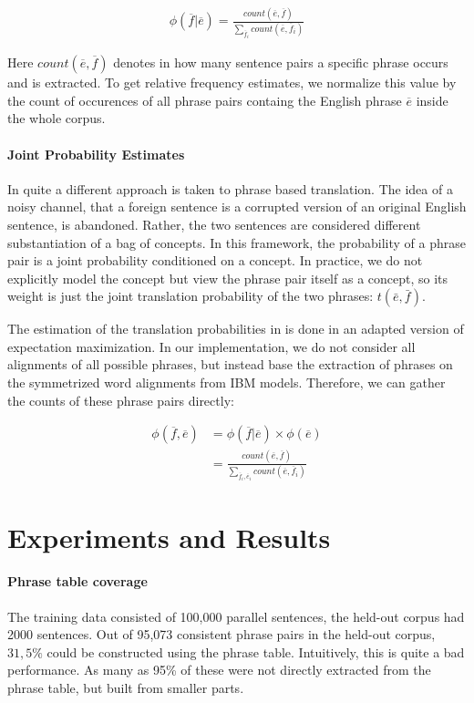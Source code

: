 \documentclass[11pt]{article}
\begin{document}
\begin{align*}
\phi(\overline{f}|\overline{e}) = \frac{count(\overline{e}, \overline{f})}{\sum_{\overline{f}_i} count(\overline{e},\overline{f}_i)}
\end{align*}

Here $count(\overline{e}, \overline{f})$ denotes in how many sentence pairs a specific phrase occurs and is extracted. To get relative frequency estimates, we normalize this value by the count of occurences of all phrase pairs containg the English phrase $\overline{e}$ inside the whole corpus.


\paragraph{Joint Probability Estimates}
In \cite{marcu2002} quite a different approach is taken to phrase based translation. The idea of a noisy channel, that a foreign sentence is a corrupted version of an original English sentence, is abandoned. Rather, the two sentences are considered different substantiation of a bag of concepts. In this framework, the probability of a phrase pair is a joint probability conditioned on a concept. In practice, we do not explicitly model the concept but view the phrase pair itself as a concept, so its weight is just the joint translation probability of the two phrases: $t(\bar{e},\bar{f})$.

The estimation of the translation probabilities in \cite{marcu2002} is done in an adapted version of expectation maximization. 
In our implementation, we do not consider all alignments of all possible phrases, but instead base the extraction of phrases on the symmetrized word alignments from IBM models. Therefore, we can gather the counts of these phrase pairs directly:

\begin{align*}
\phi(\overline{f},\overline{e}) &=\phi(\overline{f}|\overline{e}) \times \phi(\overline{e}) \\
&=\frac{count(\overline{e}, \overline{f})}{\sum_{\overline{f}_i, \overline{e}_i} count(\overline{e},\overline{f}_i)}
\end{align*}


\section{Experiments and Results}
\label{Eval}



\paragraph{Phrase table coverage}
The training data consisted of 100,000 parallel sentences, the held-out corpus had 2000 sentences. Out of 95,073 consistent phrase pairs in the held-out corpus, $31,5\%$ could be constructed using the phrase table. Intuitively, this is quite a bad performance. As many as 95\% of these were not directly extracted from the phrase table, but built from smaller parts.
\end{document}
